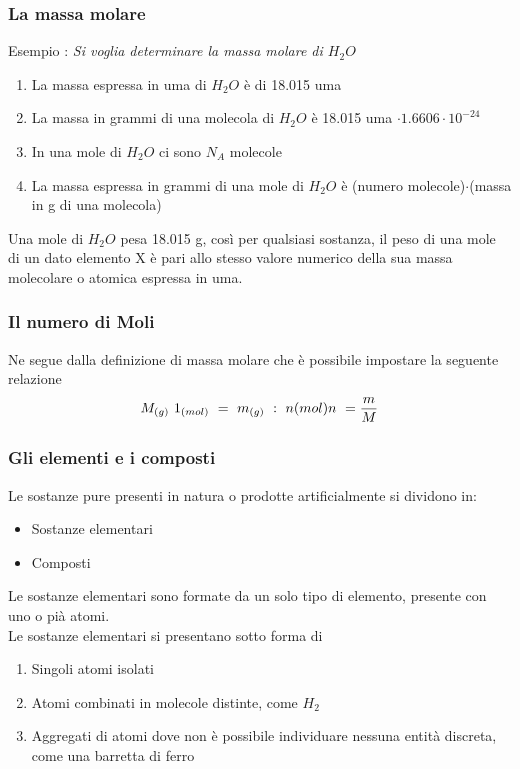 \documentclass{article}
\begin{document}
\subsubsection{La massa molare}
Esempio : \textit{Si voglia determinare la massa molare di $H_2O$}
\begin{enumerate}
    \item La massa espressa in uma di $H_2O$ è di 18.015 uma  
    \item La massa in grammi di una molecola di $H_2O$ è 18.015 uma  $\cdot 1.6606\cdot 10^{-24}$
    \item In una mole di $H_2O$ ci sono $N_A$ molecole
    \item La massa espressa in grammi di una mole di $H_2O$ è (numero molecole)$\cdot$(massa in g di una molecola)
\end{enumerate}
Una mole di $H_2O$ pesa 18.015 g, così per qualsiasi sostanza, il peso di una mole di un dato elemento X
è pari allo stesso valore numerico della sua massa molecolare o atomica espressa in uma.

\subsubsection*{Il numero di Moli}
Ne segue dalla definizione di massa molare che è possibile impostare la seguente relazione
\begin{equation*}
    M_{(g)} \ 1_{(mol)} \ = \ m_{(g)} \ :\ n{(mol)} \\
    n \ = \frac{m}{M}
\end{equation*}
\subsubsection{Gli elementi e i composti}
Le sostanze pure presenti in natura o prodotte artificialmente si dividono in:
\begin{itemize}
    \item Sostanze elementari
    \item Composti
\end{itemize}
Le sostanze elementari sono formate da un solo tipo di elemento, presente con uno o pià atomi.\\
Le sostanze elementari si presentano sotto forma di 
\begin{enumerate}
    \item Singoli atomi isolati
    \item Atomi combinati in molecole distinte, come $H_2$
    \item Aggregati di atomi dove non è possibile individuare nessuna entità discreta, come una barretta di ferro
\end{enumerate}
\end{document}
